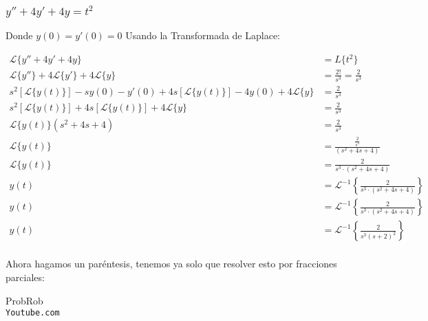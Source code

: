 \documentclass[12pt]{report}                                %
\begin{document}
        \subsubsection{$y''+4y'+4y=t^2$}

            Donde $y(0) = y'(0) = 0$
            Usando la Transformada de Laplace:

            \begin{equation*}   
            \begin{split}
                \mathscr{L}\{ y''+4y'+4y \} &= L\{t^2\}                                                          \\
                \mathscr{L}\{y''\} +4\mathscr{L}\{y'\}+4\mathscr{L}\{y\} &= \frac{2!}{s^3} = \frac{2}{s^3}       \\
                s^2[\mathscr{L}\{y(t)\}] -sy(0) -y'(0)+4s[\mathscr{L}\{y(t)\}] -4y(0)+4\mathscr{L}\{y\} 
                                                                        &= \frac{2}{s^3}                         \\
                s^2[\mathscr{L}\{y(t)\}] +4s[\mathscr{L}\{y(t)\}]+4\mathscr{L}\{y\} &= \frac{2}{s^3}             \\
                \mathscr{L}\{y(t)\} (s^2+4s+4) &= \frac{2}{s^3}                                                  \\
                \mathscr{L}\{y(t)\}  &= \frac{\frac{2}{s^3}}{(s^2+4s+4)}                                         \\
                \mathscr{L}\{y(t)\}  &= \frac{2}{s^3 \cdot (s^2+4s+4)}                                           \\
                y(t)  &= \mathscr{L}^{-1} \left\{ \frac{2}{s^3 \cdot (s^2+4s+4)} \right\}                        \\
                y(t)  &= \mathscr{L}^{-1} \left\{ \frac{2}{s^3 \cdot (s^2+4s+4)} \right\}                        \\
                y(t)  &= \mathscr{L}^{-1} \left\{ \frac{2}{s^3(s+2)^2} \right\}                                  \\
            \end{split}
            \end{equation*}


            Ahora hagamos un paréntesis, tenemos ya solo que resolver esto por fracciones parciales:

            
\clearpage

	\begin{thebibliography}{9}

		ProbRob
		\\\texttt{Youtube.com}


	 

\end{thebibliography}
\end{document}
